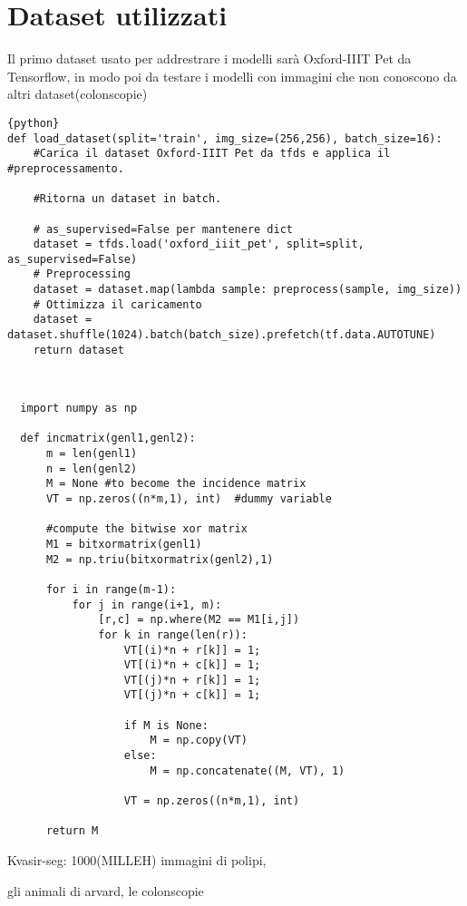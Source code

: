 \documentclass[12pt,a4paper,openright,twoside]{book}
\newcommand{\TODOComment}[1]{}
\begin{document}
\section{Dataset utilizzati}
Il primo dataset usato per addrestrare i modelli sarà Oxford-IIIT Pet da Tensorflow, in modo poi da testare i modelli con immagini che non conoscono da altri dataset(colonscopie)\\
\begin{lstlisting}{python}
def load_dataset(split='train', img_size=(256,256), batch_size=16):
    #Carica il dataset Oxford-IIIT Pet da tfds e applica il #preprocessamento.

    #Ritorna un dataset in batch.

    # as_supervised=False per mantenere dict
    dataset = tfds.load('oxford_iiit_pet', split=split, as_supervised=False) 
    # Preprocessing
    dataset = dataset.map(lambda sample: preprocess(sample, img_size))  
    # Ottimizza il caricamento
    dataset = dataset.shuffle(1024).batch(batch_size).prefetch(tf.data.AUTOTUNE)  
    return dataset
\end{lstlisting}\\

\begin{verbatim}
  import numpy as np
      
  def incmatrix(genl1,genl2):
      m = len(genl1)
      n = len(genl2)
      M = None #to become the incidence matrix
      VT = np.zeros((n*m,1), int)  #dummy variable
      
      #compute the bitwise xor matrix
      M1 = bitxormatrix(genl1)
      M2 = np.triu(bitxormatrix(genl2),1) 
  
      for i in range(m-1):
          for j in range(i+1, m):
              [r,c] = np.where(M2 == M1[i,j])
              for k in range(len(r)):
                  VT[(i)*n + r[k]] = 1;
                  VT[(i)*n + c[k]] = 1;
                  VT[(j)*n + r[k]] = 1;
                  VT[(j)*n + c[k]] = 1;
                  
                  if M is None:
                      M = np.copy(VT)
                  else:
                      M = np.concatenate((M, VT), 1)
                  
                  VT = np.zeros((n*m,1), int)
      
      return M
  \end{verbatim}

Kvasir-seg: 1000(MILLEH) immagini di polipi, 

gli animali di arvard, le colonscopie \TODOComment{Approfondire aggiungendo link ai dataset e approfondire cose che non ci sono}
\end{document}

